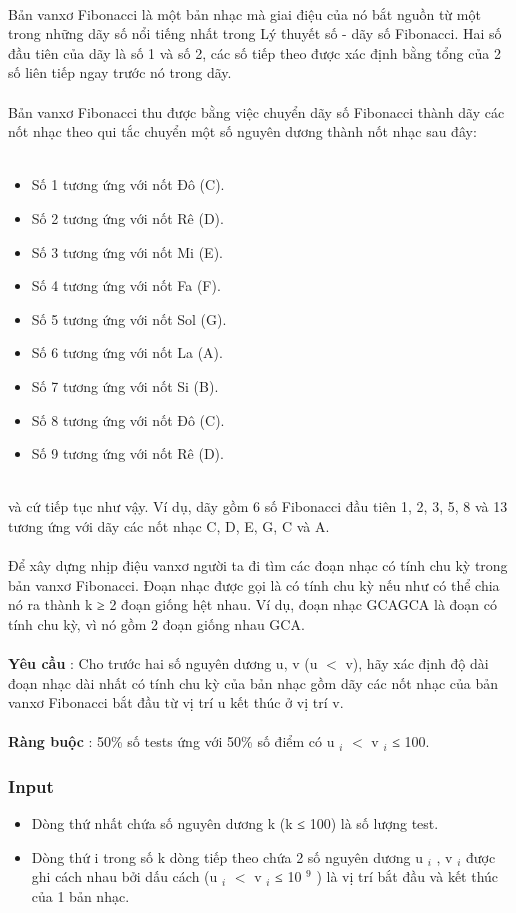 

 

Bản vanxơ Fibonacci là một bản nhạc mà giai điệu của nó bắt nguồn từ một trong những dãy số nổi tiếng nhất trong Lý thuyết số - dãy số Fibonacci. Hai số đầu tiên của dãy là số 1 và số 2, các số tiếp theo được xác định bằng tổng của 2 số liên tiếp ngay trước nó trong dãy.
\\
\\Bản vanxơ Fibonacci thu được bằng việc chuyển dãy số Fibonacci thành dãy các nốt nhạc theo qui tắc chuyển một số nguyên dương thành nốt nhạc sau đây:
\\ 
\begin{itemize}
	\item Số 1 tương ứng với nốt Đô (C).
	\item Số 2 tương ứng với nốt Rê (D).
	\item Số 3 tương ứng với nốt Mi (E).
	\item Số 4 tương ứng với nốt Fa (F).
	\item Số 5 tương ứng với nốt Sol (G).
	\item Số 6 tương ứng với nốt La (A).
	\item Số 7 tương ứng với nốt Si (B).
	\item Số 8 tương ứng với nốt Đô (C).
	\item Số 9 tương ứng với nốt Rê (D).
\end{itemize}


\\và cứ tiếp tục như vậy. Ví dụ, dãy gồm 6 số Fibonacci đầu tiên 1, 2, 3, 5, 8 và 13 tương ứng với dãy các nốt nhạc C, D, E, G, C và A.
\\
\\Để xây dựng nhịp điệu vanxơ người ta đi tìm các đoạn nhạc có tính chu kỳ trong bản vanxơ Fibonacci. Đoạn nhạc được gọi là có tính chu kỳ nếu như có thể chia nó ra thành k ≥ 2 đoạn giống hệt nhau. Ví dụ, đoạn nhạc GCAGCA là đoạn có tính chu kỳ, vì nó gồm 2 đoạn giống nhau GCA.
\\
\\\textbf{Yêu cầu } : Cho trước hai số nguyên dương u, v (u $<$ v), hãy xác định độ dài đoạn nhạc dài nhất có tính chu kỳ của bản nhạc gồm dãy các nốt nhạc của bản vanxơ Fibonacci bắt đầu từ vị trí u kết thúc ở vị trí v.
\\
\\\textbf{Ràng buộc } : 50\% số tests ứng với 50\% số điểm có u $_ i $ $<$ v $_ i $ ≤ 100.

\subsubsection{Input}
\begin{itemize}
	\item Dòng thứ nhất chứa số nguyên dương k (k ≤ 100) là số lượng test.
	\item Dòng thứ i trong số k dòng tiếp theo chứa 2 số nguyên dương u $_ i $ , v $_ i $ được ghi cách nhau bởi dấu cách (u $_ i $ $<$ v $_ i $ ≤ 10 $^ 9 $ ) là vị trí bắt đầu và kết thúc của 1 bản nhạc.
\end{itemize}

